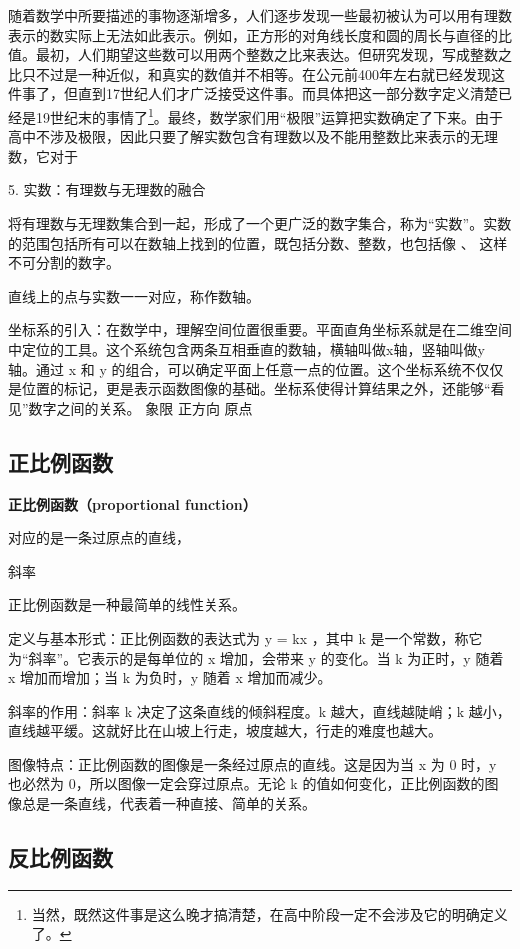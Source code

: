 随着数学中所要描述的事物逐渐增多，人们逐步发现一些最初被认为可以用有理数表示的数实际上无法如此表示。例如，正方形的对角线长度和圆的周长与直径的比值。最初，人们期望这些数可以用两个整数之比来表达。但研究发现，写成整数之比只不过是一种近似，和真实的数值并不相等。在公元前400年左右就已经发现这件事了，但直到17世纪人们才广泛接受这件事。而具体把这一部分数字定义清楚已经是19世纪末的事情了\footnote{当然，既然这件事是这么晚才搞清楚，在高中阶段一定不会涉及它的明确定义了。}。最终，数学家们用“极限”运算把实数确定了下来。由于高中不涉及极限，因此只要了解实数包含有理数以及不能用整数比来表示的无理数，它对于


5. 实数：有理数与无理数的融合

将有理数与无理数集合到一起，形成了一个更广泛的数字集合，称为“实数”。实数的范围包括所有可以在数轴上找到的位置，既包括分数、整数，也包括像  、 \pi 这样不可分割的数字。



直线上的点与实数一一对应，称作数轴。

坐标系的引入：在数学中，理解空间位置很重要。平面直角坐标系就是在二维空间中定位的工具。这个系统包含两条互相垂直的数轴，横轴叫做x轴，竖轴叫做y轴。通过 x 和 y 的组合，可以确定平面上任意一点的位置。这个坐标系统不仅仅是位置的标记，更是表示函数图像的基础。坐标系使得计算结果之外，还能够“看见”数字之间的关系。
象限
正方向
原点

\subsection{正比例函数}

\textbf{正比例函数（proportional function）}

对应的是一条过原点的直线，

斜率

正比例函数是一种最简单的线性关系。

定义与基本形式：正比例函数的表达式为  y = kx ，其中 k 是一个常数，称它为“斜率”。它表示的是每单位的 x 增加，会带来 y 的变化。当 k 为正时，y 随着 x 增加而增加；当 k 为负时，y 随着 x 增加而减少。

斜率的作用：斜率 k 决定了这条直线的倾斜程度。k 越大，直线越陡峭；k 越小，直线越平缓。这就好比在山坡上行走，坡度越大，行走的难度也越大。

图像特点：正比例函数的图像是一条经过原点的直线。这是因为当 x 为 0 时，y 也必然为 0，所以图像一定会穿过原点。无论 k 的值如何变化，正比例函数的图像总是一条直线，代表着一种直接、简单的关系。

\subsection{反比例函数}

